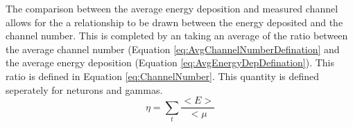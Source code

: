 The comparison between the average energy deposition and measured channel allows for the a relationship to be drawn between the energy deposited and the channel number.
This is completed by an taking an average of the ratio between the average channel number (Equation \ref{eq:AvgChannelNumberDefination} and the average energy deposition (Equation \ref{eq:AvgEnergyDepDefination}).
This ratio is defined in Equation \ref{eq:ChannelNumber}.  This quantity is defined seperately for neturons and gammas.
\begin{equation}
\label{eq:ChannelNumber}
\eta = \sum_t { \frac{<E>}{<\mu}} 
\end{equation}
